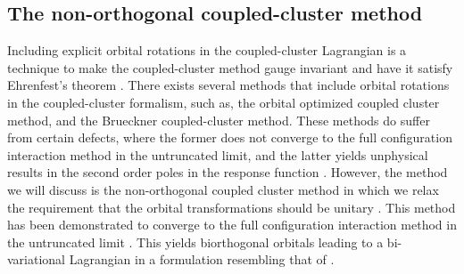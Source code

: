         \subsection{The non-orthogonal coupled-cluster method}
            \label{subsec:nocc}
            Including explicit orbital rotations in the coupled-cluster
            Lagrangian is a technique to make the coupled-cluster method gauge
            invariant \cite{gauge-invariant-thomas, gauge-invariant-thomas-2}
            and have it satisfy Ehrenfest's theorem \cite{rolf-nocc}.
            There exists several methods that include orbital rotations in the
            coupled-cluster formalism, such as, the orbital optimized coupled
            cluster method, and the Brueckner coupled-cluster method.
            These methods do suffer from certain defects, where the former does
            not converge to the full configuration interaction method in the
            untruncated limit, and the latter yields unphysical results in the
            second order poles in the response function \cite{rolf-nocc}.
            However, the method we will discuss is the non-orthogonal coupled
            cluster method \cite{gauge-invariant-thomas-2} in which we relax the
            requirement that the orbital transformations should be unitary
            \cite{rolf-nocc}.
            This method has been demonstrated to converge to the full
            configuration interaction method in the untruncated limit
            \cite{rolf-nocc}.
            This yields biorthogonal orbitals leading to a bi-variational
            Lagrangian \cite{kvaal2013variational} in a formulation resembling
            that of \citeauthor{arponen1983311} \cite{arponen1983311}.

